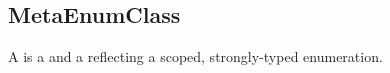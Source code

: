 \subsection{MetaEnumClass}
\label{concept-MetaEnumClass}

A  is a  and a 
reflecting a scoped, strongly-typed enumeration.


